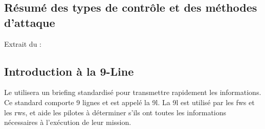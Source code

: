 \begin{minipage}{\textwidth}
	\subsection{Résumé des types de contrôle et des méthodes d'attaque}
	\begin{e1}
		\item
		Extrait du \jp: \\
		\vskip2mm
	\end{e1}
\end{minipage}


\subsection{Introduction à la 9-Line}

Le \ja{} utilisera un briefing standardisé pour transmettre rapidement les informations. Ce standard comporte 9 lignes et est appelé la \gls{9l}. La \gls{9l} est utilisé par les \glspl{fw} et les \glspl{rw}, et aide les pilotes à déterminer s'ils ont toutes les informations nécessaires à l'exécution de leur mission.


